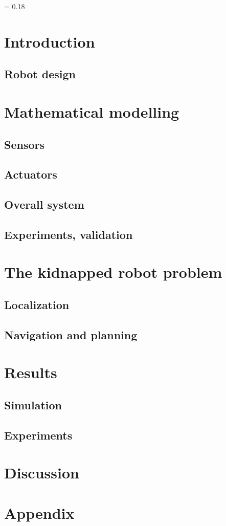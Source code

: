 \documentclass[12pt,a4paper]{article}
\newcommand*{\titleM}{
\thispagestyle{empty}
\newlength{\drop}
\begingroup%


\drop = 0.18\textheight
\centering
\vspace*{\drop}
\vspace*{\drop}
{\Huge\bfseries \ass}\\[\baselineskip]
{\large\scshape \name}\par
\vfill
\vspace*{2\drop}
\endgroup

\thispagestyle{empty}
\makebox[\textwidth]{}
\pagebreak
\makebox[\textwidth]{}
\setcounter{page}{1}
}
\begin{document}
	\titleM
	
	\section{Introduction}
	
		\subsection{Robot design}
	
	\section{Mathematical modelling}
	
		\subsection{Sensors}
		
		\subsection{Actuators}
		
		\subsection{Overall system}
		
		\subsection{Experiments, validation}
		
	\section{The kidnapped robot problem}
	
		\subsection{Localization}
		
		\subsection{Navigation and planning}
 	
 	\section{Results}
 	
 		\subsection{Simulation}
 		
 		\subsection{Experiments}
 		
 	\section{Discussion}
 
 
 
 \printbibliography
 
 \section*{Appendix}
 
 		 	
	 	
\end{document}
